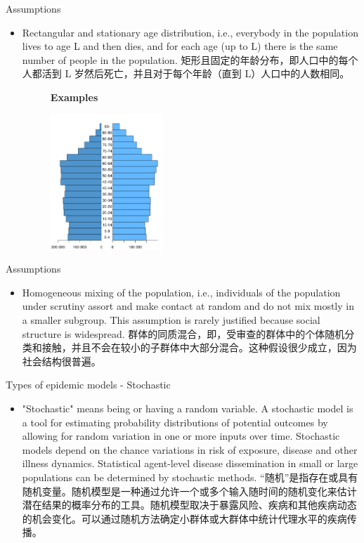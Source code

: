 \documentclass[
  notheorems,
  aspectratio=54,
]{beamer}
\begin{document}
\begin{frame}{Assumptions}
  \begin{itemize}
    \item Rectangular and stationary age distribution, i.e., everybody in the population lives to age L and then dies, and for each age (up to L) there is the same number of people in the population. 矩形且固定的年龄分布，即人口中的每个人都活到 L 岁然后死亡，并且对于每个年龄（直到 L）人口中的人数相同。
  \begin{figure}
    \centering
    \textbf{Examples}\par\medskip
    \includegraphics[width=0.4\textwidth]{age_distribution.png}
  \end{figure}
  \end{itemize}
\end{frame}

\begin{frame}{Assumptions}
  \begin{itemize}
    \item Homogeneous mixing of the population, i.e., individuals of the population under scrutiny assort and make contact at random and do not mix mostly in a smaller subgroup. This assumption is rarely justified because social structure is widespread. 群体的同质混合，即，受审查的群体中的个体随机分类和接触，并且不会在较小的子群体中大部分混合。这种假设很少成立，因为社会结构很普遍。
  \end{itemize}
\end{frame}

\begin{frame}{Types of epidemic models - Stochastic}
  \begin{itemize}
    \item "Stochastic" means being or having a random variable. A stochastic model is a tool for estimating probability distributions of potential outcomes by allowing for random variation in one or more inputs over time. Stochastic models depend on the chance variations in risk of exposure, disease and other illness dynamics. Statistical agent-level disease dissemination in small or large populations can be determined by stochastic methods. “随机”是指存在或具有随机变量。随机模型是一种通过允许一个或多个输入随时间的随机变化来估计潜在结果的概率分布的工具。随机模型取决于暴露风险、疾病和其他疾病动态的机会变化。可以通过随机方法确定小群体或大群体中统计代理水平的疾病传播。
  \end{itemize}
\end{frame}
\end{document}
